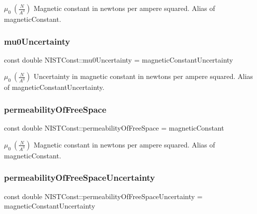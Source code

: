 $\mu_0 \ (\frac{N}{A^3})$ Magnetic constant in newtons per ampere squared. Alias of magnetic\+Constant. \mbox{\label{group___magnetic_constant_ga8c9dd97d5f05e75e3eb2b2daaa0e1b7e}} 
\subsubsection{\texorpdfstring{mu0\+Uncertainty}{mu0Uncertainty}}
{\footnotesize\ttfamily const double N\+I\+S\+T\+Const\+::mu0\+Uncertainty = magnetic\+Constant\+Uncertainty}

$\mu_0 \ (\frac{N}{A^3})$ Uncertainty in magnetic constant in newtons per ampere squared. Alias of magnetic\+Constant\+Uncertainty. \mbox{\label{group___magnetic_constant_gad7321a170873a7532ecfb8383d827d1e}} 
\subsubsection{\texorpdfstring{permeability\+Of\+Free\+Space}{permeabilityOfFreeSpace}}
{\footnotesize\ttfamily const double N\+I\+S\+T\+Const\+::permeability\+Of\+Free\+Space = magnetic\+Constant}

$\mu_0 \ (\frac{N}{A^3})$ Magnetic constant in newtons per ampere squared. Alias of magnetic\+Constant. \mbox{\label{group___magnetic_constant_gab95a7a90e35194a4d31736c375e57bde}} 
\subsubsection{\texorpdfstring{permeability\+Of\+Free\+Space\+Uncertainty}{permeabilityOfFreeSpaceUncertainty}}
{\footnotesize\ttfamily const double N\+I\+S\+T\+Const\+::permeability\+Of\+Free\+Space\+Uncertainty = magnetic\+Constant\+Uncertainty}

